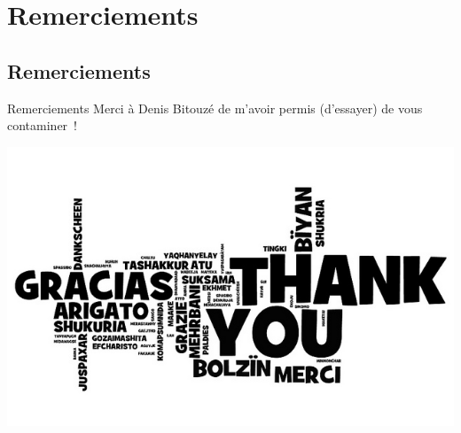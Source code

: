 \documentclass[presentation,t,hideothersubsections]{beamer}
\begin{document}
\section{Remerciements}
\label{sec-8}

\subsection{Remerciements}
\label{sec-8-1}

\begin{frame}[label=sec-8-1-1]{Remerciements}
Merci à Denis Bitouzé de m'avoir permis (d'essayer) de vous contaminer~!

\includegraphics[width=.9\linewidth]{thank-you-all-languages.png}
\end{frame}
\end{document}
